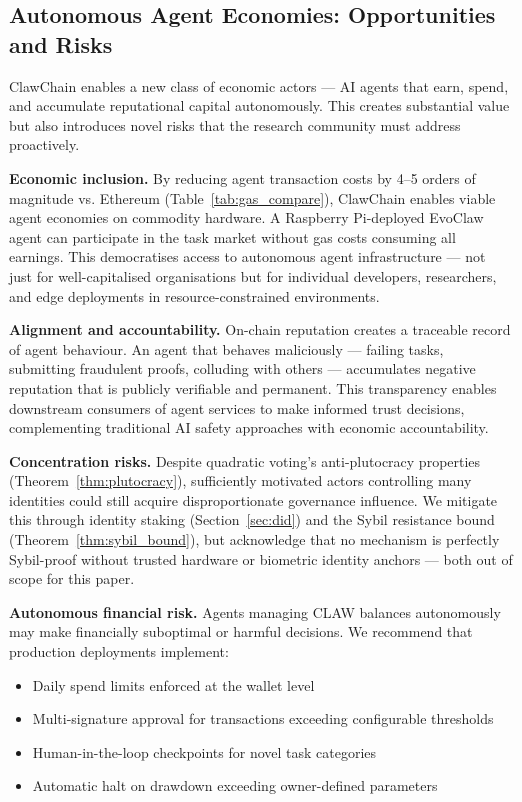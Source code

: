 \documentclass[conference]{IEEEtran}
\begin{document}
\subsection{Autonomous Agent Economies: Opportunities and Risks}

ClawChain enables a new class of economic actors — AI agents that earn, spend, and accumulate reputational capital autonomously. This creates substantial value but also introduces novel risks that the research community must address proactively.

\textbf{Economic inclusion.} By reducing agent transaction costs by 4--5 orders of magnitude vs. Ethereum (Table~\ref{tab:gas_compare}), ClawChain enables viable agent economies on commodity hardware. A Raspberry Pi-deployed EvoClaw agent can participate in the task market without gas costs consuming all earnings. This democratises access to autonomous agent infrastructure — not just for well-capitalised organisations but for individual developers, researchers, and edge deployments in resource-constrained environments.

\textbf{Alignment and accountability.} On-chain reputation creates a traceable record of agent behaviour. An agent that behaves maliciously — failing tasks, submitting fraudulent proofs, colluding with others — accumulates negative reputation that is publicly verifiable and permanent. This transparency enables downstream consumers of agent services to make informed trust decisions, complementing traditional AI safety approaches with economic accountability.

\textbf{Concentration risks.} Despite quadratic voting's anti-plutocracy properties (Theorem~\ref{thm:plutocracy}), sufficiently motivated actors controlling many identities could still acquire disproportionate governance influence. We mitigate this through identity staking (Section~\ref{sec:did}) and the Sybil resistance bound (Theorem~\ref{thm:sybil_bound}), but acknowledge that no mechanism is perfectly Sybil-proof without trusted hardware or biometric identity anchors — both out of scope for this paper.

\textbf{Autonomous financial risk.} Agents managing CLAW balances autonomously may make financially suboptimal or harmful decisions. We recommend that production deployments implement:
\begin{itemize}
    \item Daily spend limits enforced at the wallet level
    \item Multi-signature approval for transactions exceeding configurable thresholds
    \item Human-in-the-loop checkpoints for novel task categories
    \item Automatic halt on drawdown exceeding owner-defined parameters
\end{itemize}
\end{document}
